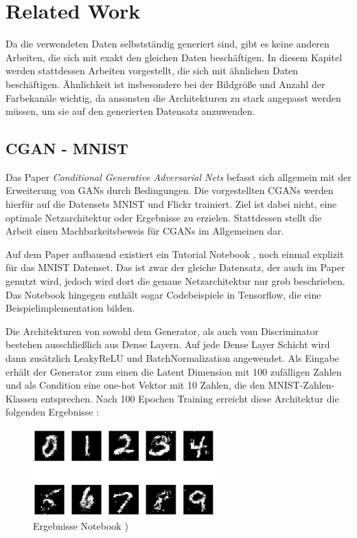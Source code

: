 \section{Related Work}
\label{chapter:related-work}
Da die verwendeten Daten selbstständig generiert sind, gibt es keine anderen Arbeiten, die sich mit exakt den gleichen Daten beschäftigen.
In diesem Kapitel werden stattdessen Arbeiten vorgestellt, die sich mit ähnlichen Daten beschäftigen.
Ähnlichkeit ist insbesondere bei der Bildgröße und Anzahl der Farbekanäle wichtig, da ansonsten die Architekturen zu stark angepasst werden müssen, um sie auf den generierten Datensatz anzuwenden.

\subsection{CGAN - MNIST}
Das Paper \textit{Conditional Generative Adversarial Nets} \cite{mirza2014conditional} befasst sich allgemein mit der Erweiterung von GANs durch Bedingungen.
Die vorgestellten CGANs werden hierfür auf die Datensets MNIST und Flickr trainiert.
Ziel ist dabei nicht, eine optimale Netzarchitektur oder Ergebnisse zu erzielen.
Stattdessen stellt die Arbeit einen Machbarkeitsbeweis für CGANs im Allgemeinen dar.
\newline

Auf dem Paper aufbauend existiert ein Tutorial Notebook \cite{cgan-tutorial-notebook}, noch einmal explizit für das MNIST Datenset.
Das ist zwar der gleiche Datensatz, der auch im Paper genutzt wird, jedoch wird dort die genaue Netzarchitektur nur grob beschrieben.
Das Notebook hingegen enthält sogar Codebeispiele in Tensorflow, die eine Beispielimplementation bilden.
\newline

Die Architekturen von sowohl dem Generator, als auch vom Discriminator bestehen ausschließlich aus Dense Layern.
Auf jede Dense Layer Schicht wird dann zusätzlich LeakyReLU und BatchNormalization angewendet.
Als Eingabe erhält der Generator zum einen die Latent Dimension mit 100 zufälligen Zahlen und als Condition eine one-hot Vektor mit 10 Zahlen, die den MNIST-Zahlen-Klassen entsprechen.
Nach 100 Epochen Training erreicht diese Architektur die folgenden Ergebnisse :

\begin{figure}[H]
	\centering
	\includegraphics[width=7cm]{kapitel/2_stand_der_technik/img/cgan-notebook-ergebnisse.png}
	\caption{Ergebnisse Notebook \cite{cgan-tutorial-notebook}) }
\end{figure}

